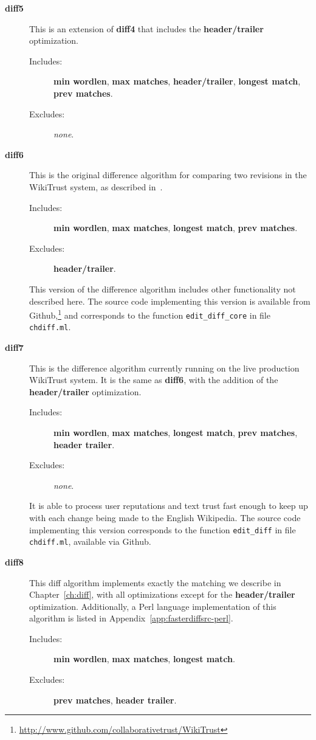 \begin{description}
\item[\textbf{diff5}]
    This is an extension of \textbf{diff4} that includes the
    \textbf{header/trailer} optimization.
    \begin{description}
    \item[Includes:]
	\textbf{min wordlen}, \textbf{max matches},
	\textbf{header/trailer}, \textbf{longest match}, \\
	\textbf{prev matches}.
    \item[Excludes:] \textit{none}.
    \end{description}

\item[\textbf{diff6}] This is the original difference algorithm
    for comparing two revisions in the WikiTrust system, as
    described in~\cite{Adler2007}.
    \begin{description}
    \item[Includes:]
	\textbf{min wordlen}, \textbf{max matches}, \textbf{longest match},
	\textbf{prev matches}.
    \item[Excludes:]
	\textbf{header/trailer}.
    \end{description}
    This version of the difference algorithm includes other
    functionality not described here.
    The source code implementing this version is available from
    Github,\footnote{\url{http://www.github.com/collaborativetrust/WikiTrust}}
    and corresponds to the function \texttt{edit\_diff\_core} in
    file \texttt{chdiff.ml}.

\item[\textbf{diff7}]
    This is the difference algorithm currently running on the live
    production
    WikiTrust system.
    It is the same as \textbf{diff6}, with the addition of the
    \textbf{header/trailer} optimization.
    \begin{description}
    \item[Includes:]
	\textbf{min wordlen}, \textbf{max matches}, \textbf{longest match},
	\textbf{prev matches}, \textbf{header trailer}.
    \item[Excludes:] \textit{none}.
    \end{description}
    It is able to process user reputations and text trust fast enough
    to keep up with each change being made to the English Wikipedia.
    The source code implementing this version
    corresponds to the function \texttt{edit\_diff} in
    file \texttt{chdiff.ml}, available via Github.

\item[\textbf{diff8}]
    This diff algorithm implements exactly the matching
    we describe in Chapter~\ref{ch:diff}, with all optimizations except
    for the \textbf{header/trailer} optimization.
    Additionally, a Perl language implementation of
    this algorithm is listed in Appendix~\ref{app:fasterdiffsrc-perl}.
    \begin{description}
    \item[Includes:]
	\textbf{min wordlen}, \textbf{max matches}, \textbf{longest match}.
    \item[Excludes:]
	\textbf{prev matches}, \textbf{header trailer}.
    \end{description}


\end{description}
